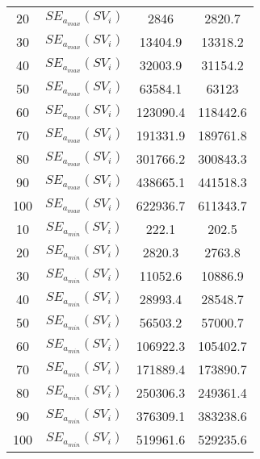 \begin{table}[H]
\begin{tabular}{cc|cc}
	20      & $SE_{a_{max}}(SV_i)$     & 2846                      & 2820.7                    \\
	30      & $SE_{a_{max}}(SV_i)$     & 13404.9                   & 13318.2                   \\
	40      & $SE_{a_{max}}(SV_i)$     & 32003.9                   & 31154.2                   \\
	50      & $SE_{a_{max}}(SV_i)$     & 63584.1                   & 63123                     \\
	60      & $SE_{a_{max}}(SV_i)$     & 123090.4                  & 118442.6                  \\
	70      & $SE_{a_{max}}(SV_i)$     & 191331.9                  & 189761.8                  \\
	80      & $SE_{a_{max}}(SV_i)$     & 301766.2                  & 300843.3                  \\
	90      & $SE_{a_{max}}(SV_i)$     & 438665.1                  & 441518.3                  \\
	100     & $SE_{a_{max}}(SV_i)$     & 622936.7                  & 611343.7                  \\
	10      & $SE_{a_{min}}(SV_i)$   & 222.1                     & 202.5                     \\
	20      & $SE_{a_{min}}(SV_i)$   & 2820.3                    & 2763.8                    \\
	30      & $SE_{a_{min}}(SV_i)$   & 11052.6                   & 10886.9                   \\
	40      & $SE_{a_{min}}(SV_i)$   & 28993.4                   & 28548.7                   \\
	50      & $SE_{a_{min}}(SV_i)$   & 56503.2                   & 57000.7                   \\
	60      & $SE_{a_{min}}(SV_i)$   & 106922.3                  & 105402.7                  \\
	70      & $SE_{a_{min}}(SV_i)$   & 171889.4                  & 173890.7                  \\
	80      & $SE_{a_{min}}(SV_i)$   & 250306.3                  & 249361.4                  \\
	90      & $SE_{a_{min}}(SV_i)$   & 376309.1                  & 383238.6                  \\
	100     & $SE_{a_{min}}(SV_i)$   & 519961.6                  & 529235.6                 
\end{tabular}
\end{table}